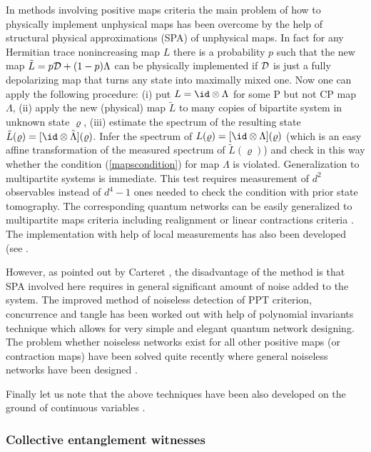 \documentclass[twocolumn,aps,rmp]{revtex4}
\begin{document}
In methods involving positive maps criteria the main problem of how
to physically implement unphysical maps has been overcome by the
help of structural physical approximations (SPA) of unphysical maps.
In fact for any Hermitian trace nonincreasing map $L$ there is a
probability $p$ such that the new map $\tilde{L}=p{\cal D} +
(1-p)\Lambda$ can be physically implemented if ${\cal D}$ is just a
fully depolarizing map that turns any state into maximally
mixed one. Now one can apply the following procedure: (i) put $L=\id
\otimes \Lambda$ for some P but not CP map $\Lambda$, (ii) apply the
new (physical) map $\tilde{L}$ to many copies of bipartite system in
unknown state $\varrho$, (iii) estimate the spectrum of the
resulting state $\tilde{L}(\varrho)=[\id \otimes
\tilde{\Lambda}](\varrho)$. Infer the spectrum of $L(\varrho)=[\id
\otimes \Lambda](\varrho)$ (which is an easy affine transformation
of the measured spectrum of $\tilde{ L}(\varrho)$) and check in this
way whether the condition (\ref{mapscondition}) for map $\Lambda$ is
violated. Generalization to multipartite systems is immediate. This
test requires measurement of $d^{2}$ observables instead of
$d^{4}-1$ ones needed to check the condition with prior state
tomography. The corresponding quantum networks can be easily
generalized to multipartite maps criteria including realignment or
linear contractions criteria \cite{reshuff}. The implementation with
help of local measurements has also been developed (see
\cite{LOCCmapsdetection}.

However, as pointed out by Carteret \cite{Carteret}, the disadvantage
of the method is that SPA involved here requires in general
significant amount of noise added to the system. The improved method
of noiseless detection of PPT criterion, concurrence and tangle has
been worked out \cite{Carteret,Carteret2003-tangle} with help of polynomial invariants
technique which allows for very simple and elegant quantum network
designing. The problem whether noiseless networks exist for all other
positive maps (or contraction maps) have been solved quite recently
where general noiseless networks have been designed \cite{Noiseless}.

Finally let us note that the above techniques have been also developed
on the ground of continuous variables
\cite{FiurasekCerf,StobinskaW-teor-s,Pregnell}.


\subsubsection{Collective entanglement witnesses \label{subsubsec:CollectiveWitnesses}}
\end{document}
